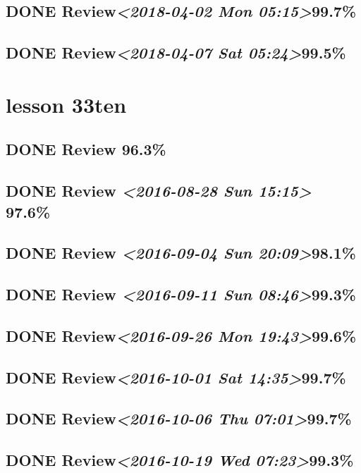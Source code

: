 \documentclass[11pt]{ctexart}
\begin{document}
\subsection{{\bfseries\sffamily DONE} Review\textit{<2018-04-02 Mon 05:15>}99.7\%}
\label{sec:org4dc63a1}
\subsection{{\bfseries\sffamily DONE} Review\textit{<2018-04-07 Sat 05:24>}99.5\%}
\label{sec:orgee8ac59}
\section{lesson 33ten}
\label{sec:org83a5eb7}
\subsection{{\bfseries\sffamily DONE} Review 96.3\%}
\label{sec:org765065a}
\subsection{{\bfseries\sffamily DONE} Review \textit{<2016-08-28 Sun 15:15> } 97.6\%}
\label{sec:orge6baad0}
\subsection{{\bfseries\sffamily DONE} Review \textit{<2016-09-04 Sun 20:09>}98.1\%}
\label{sec:org29c0c08}
\subsection{{\bfseries\sffamily DONE} Review \textit{<2016-09-11 Sun 08:46>}99.3\%}
\label{sec:orge0e4942}
\subsection{{\bfseries\sffamily DONE} Review\textit{<2016-09-26 Mon 19:43>}99.6\%}
\label{sec:org0805423}
\subsection{{\bfseries\sffamily DONE} Review\textit{<2016-10-01 Sat 14:35>}99.7\%}
\label{sec:orgc9b79c0}
\subsection{{\bfseries\sffamily DONE} Review\textit{<2016-10-06 Thu 07:01>}99.7\%}
\label{sec:org8f5be2b}
\subsection{{\bfseries\sffamily DONE} Review\textit{<2016-10-19 Wed 07:23>}99.3\%}
\label{sec:orge9797e6}
\end{document}
